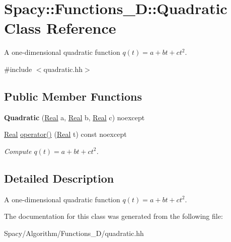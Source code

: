 \hypertarget{classSpacy_1_1Functions__1D_1_1Quadratic}{}\section{Spacy\+:\+:Functions\+\_\+D\+:\+:Quadratic Class Reference}
\label{classSpacy_1_1Functions__1D_1_1Quadratic}


A one-\/dimensional quadratic function $q(t) = a + bt + ct^2$.  




{\ttfamily \#include $<$quadratic.\+hh$>$}

\subsection*{Public Member Functions}
\begin{DoxyCompactItemize}
\item 
\hypertarget{classSpacy_1_1Functions__1D_1_1Quadratic_a3dda95ccea43bb2d1c0d3d0662bf5a7e}{}{\bfseries Quadratic} (\hyperlink{classSpacy_1_1Real}{Real} a, \hyperlink{classSpacy_1_1Real}{Real} b, \hyperlink{classSpacy_1_1Real}{Real} c) noexcept\label{classSpacy_1_1Functions__1D_1_1Quadratic_a3dda95ccea43bb2d1c0d3d0662bf5a7e}

\item 
\hypertarget{classSpacy_1_1Functions__1D_1_1Quadratic_adc2d2a19028f32177120477aa6a5ffe2}{}\hyperlink{classSpacy_1_1Real}{Real} \hyperlink{classSpacy_1_1Functions__1D_1_1Quadratic_adc2d2a19028f32177120477aa6a5ffe2}{operator()} (\hyperlink{classSpacy_1_1Real}{Real} t) const noexcept\label{classSpacy_1_1Functions__1D_1_1Quadratic_adc2d2a19028f32177120477aa6a5ffe2}

\begin{DoxyCompactList}\small\item\em Compute $q(t) = a + bt + ct^2 $. \end{DoxyCompactList}\end{DoxyCompactItemize}


\subsection{Detailed Description}
A one-\/dimensional quadratic function $q(t) = a + bt + ct^2$. 

The documentation for this class was generated from the following file\+:\begin{DoxyCompactItemize}
\item 
Spacy/\+Algorithm/\+Functions\+\_\+D/quadratic.\+hh\end{DoxyCompactItemize}
